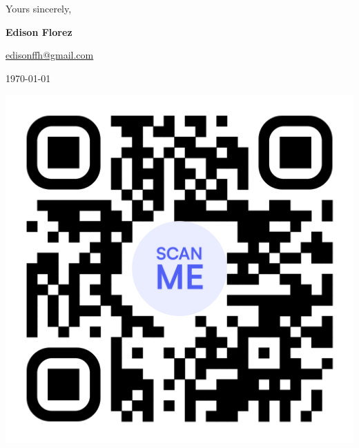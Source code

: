 \vfill
\begin{minipage}[c]{.75\textwidth}
    Yours sincerely,

    \vspace*{6mm}

    \textbf{Edison Florez}

    \href{mailto:edisonffh@gmail.com}{edisonffh@gmail.com}

    \today

\end{minipage}
\begin{minipage}[c]{.2\textwidth}
    \centering
    \href{https://github.com/e-florez/}{
        \includegraphics[scale=0.05]{figs/qrcode_github_page.png}
    }
\end{minipage}
